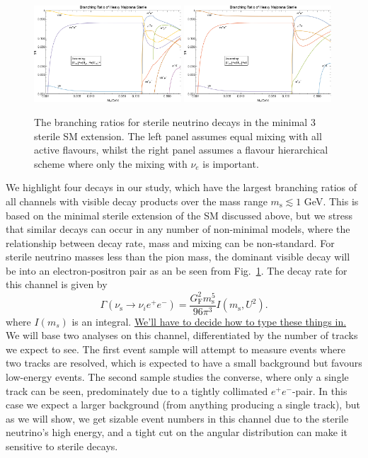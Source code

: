 \documentclass[11pt, a4paper]{article}
\newcommand{\reffig}[1]{Fig.~\ref{#1}}
\newcommand{\newtext}[2]{\textcolor{#1}{\ul{#2}}}
\begin{document}
\begin{figure}[t]
\includegraphics[width=0.49\textwidth]{figures/bounds1.pdf}  \includegraphics[width=0.49\textwidth]{figures/bounds2.pdf}
\caption{\label{fig:branchingratios}The branching ratios for sterile neutrino decays in the minimal 3 sterile SM extension. The left panel assumes equal mixing with all active flavours, whilst the right panel assumes a flavour hierarchical scheme where only the mixing with $\nu_e$ is important.}
\end{figure}

We highlight four decays in our study, which have the largest branching ratios
of all channels with visible decay products over the mass range $m_\text{s}
\lesssim 1$ GeV. This is based on the minimal sterile extension of the SM
discussed above, but we stress that similar decays can occur in any number of
non-minimal models, where the relationship between decay rate, mass and mixing
can be non-standard. For sterile neutrino masses less than the pion mass, the
dominant visible decay will be into an electron-positron pair as an be seen
from \reffig{fig:branchingratios}. The decay rate for this channel is given by 
%
\[ \Gamma\left(\nu_\text{s}\to \nu_i e^+e^-\right) =
\frac{G_\text{F}^2m_\text{s}^5}{96\pi^3}I(m_\text{s}, U^2).  \]
%
where $I(m_s)$ is an integral. \newtext{PB}{We'll have to decide how to type these things in.}
%
We will base two analyses on this channel, differentiated by the number of
tracks we expect to see. The first event sample will attempt to measure events
where two tracks are resolved, which is expected to have a small background but
favours low-energy events. The second sample studies the converse, where only a
single track can be seen, predominately due to a tightly collimated
$e^+e^-$-pair. In this case we expect a larger background (from anything
producing a single track), but as we will show, we get sizable event numbers in
this channel due to the sterile neutrino's high energy, and a tight cut on the
angular distribution can make it sensitive to sterile decays.
\end{document}

